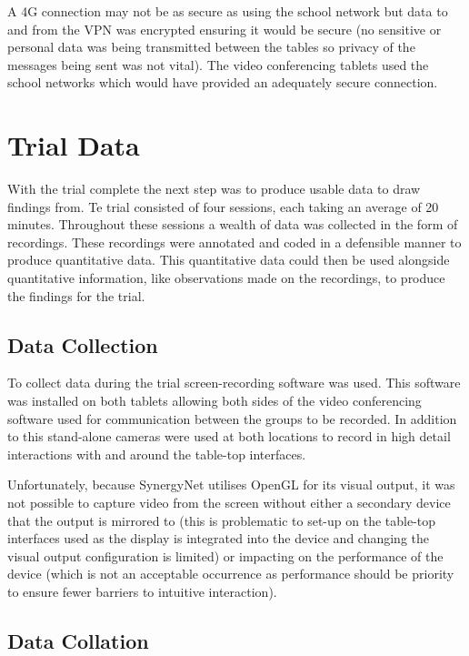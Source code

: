 \documentclass[a4paper,11pt]{article}
\begin{document}
A 4G connection may not be as secure as using the school network but data to and from the VPN was encrypted ensuring it would be secure (no sensitive or personal data was being transmitted between the tables so privacy of the messages being sent was not vital).
The video conferencing tablets used the school networks which would have provided an adequately secure connection.


\section{Trial Data} 

With the trial complete the next step was to produce usable data to draw findings from.
Te trial consisted of four sessions, each taking an average of 20 minutes.
Throughout these sessions a wealth of data was collected in the form of recordings.
These recordings were annotated and coded in a defensible manner to produce quantitative data.
This quantitative data could then be used alongside quantitative information, like observations made on the recordings, to produce the findings for the trial.
 
\subsection{Data Collection}

To collect data during the trial screen-recording software was used.
This software was installed on both tablets allowing both sides of the video conferencing software used for communication between the groups to be recorded.
In addition to this stand-alone cameras were used at both locations to record in high detail interactions with and around the table-top interfaces.

Unfortunately, because SynergyNet utilises OpenGL for its visual output, it was not possible to capture video from the screen without either a secondary device that the output is mirrored to (this is problematic to set-up on the table-top interfaces used as the display is integrated into the device and changing the visual output configuration is limited) or impacting on the performance of the device (which is not an acceptable occurrence as performance should be priority to ensure fewer barriers to intuitive interaction).

\subsection{Data Collation}
\end{document}
